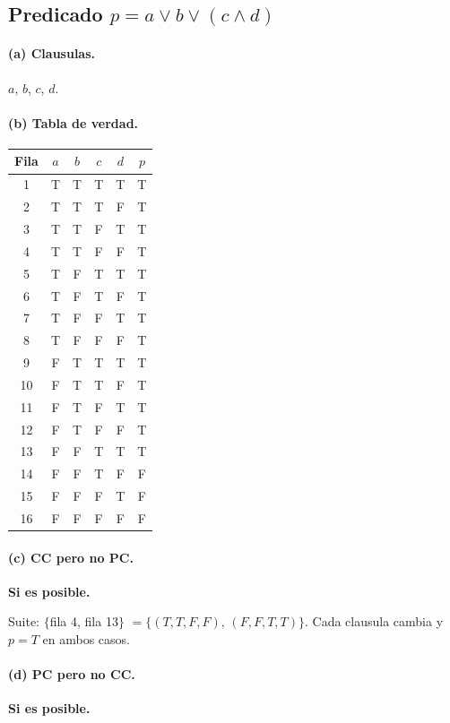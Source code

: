 \documentclass[12pt,a4paper]{article}
\begin{document}
\subsection{Predicado $p = a \vee b \vee (c \wedge d)$}

\paragraph{(a) Clausulas.} $a$, $b$, $c$, $d$.

\paragraph{(b) Tabla de verdad.}

\begin{center}
\begin{tabular}{cccccc}
\toprule
Fila & $a$ & $b$ & $c$ & $d$ & $p$ \\
\midrule
1  & T & T & T & T & T \\
2  & T & T & T & F & T \\
3  & T & T & F & T & T \\
4  & T & T & F & F & T \\
5  & T & F & T & T & T \\
6  & T & F & T & F & T \\
7  & T & F & F & T & T \\
8  & T & F & F & F & T \\
9  & F & T & T & T & T \\
10 & F & T & T & F & T \\
11 & F & T & F & T & T \\
12 & F & T & F & F & T \\
13 & F & F & T & T & T \\
14 & F & F & T & F & F \\
15 & F & F & F & T & F \\
16 & F & F & F & F & F \\
\bottomrule
\end{tabular}
\end{center}

\paragraph{(c) CC pero no PC.} \textbf{Si es posible.}

Suite: $\{$fila 4, fila 13$\}$ $=\{(T,T,F,F),\,(F,F,T,T)\}$. Cada clausula cambia y $p=T$ en
ambos casos.

\paragraph{(d) PC pero no CC.} \textbf{Si es posible.}
\end{document}
